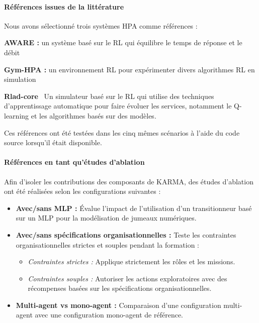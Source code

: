 \paragraph{\textbf{Références issues de la littérature}}
%
\noindent Nous avons sélectionné trois systèmes HPA comme références :
\begin{enumerate*}[label=\textbf{\arabic*)}, itemjoin={;\quad }]
    \item \textbf{AWARE :} un système basé sur le RL qui équilibre le temps de réponse et le débit~\cite{aware2023}
    \item \textbf{Gym-HPA :} un environnement RL pour expérimenter divers algorithmes RL en simulation~\cite{gymhpa2022}
    \item \textbf{Rlad-core}~\cite{Rossi2019} Un simulateur basé sur le RL qui utilise des techniques d'apprentissage automatique pour faire évoluer les services, notamment le Q-learning et les algorithmes basés sur des modèles.
\end{enumerate*}

Ces références ont été testées dans les cinq mêmes scénarios à l'aide du code source lorsqu'il était disponible.

\paragraph{\textbf{Références en tant qu'études d'ablation}}

\noindent Afin d'isoler les contributions des composants de KARMA, des études d'ablation ont été réalisées selon les configurations suivantes :
%
\begin{itemize}
    \item \textbf{Avec/sans MLP :} Évalue l'impact de l'utilisation d'un transitionneur basé sur un MLP pour la modélisation de jumeaux numériques.
    \item \textbf{Avec/sans spécifications organisationnelles :} Teste les contraintes organisationnelles strictes et souples pendant la formation :
          \begin{itemize}
              \item \textit{Contraintes strictes :} Applique strictement les rôles et les missions.
              \item \textit{Contraintes souples :} Autoriser les actions exploratoires avec des récompenses basées sur les spécifications organisationnelles.
          \end{itemize}
    \item \textbf{Multi-agent vs mono-agent :} Comparaison d'une configuration multi-agent avec une configuration mono-agent de référence.
\end{itemize}

